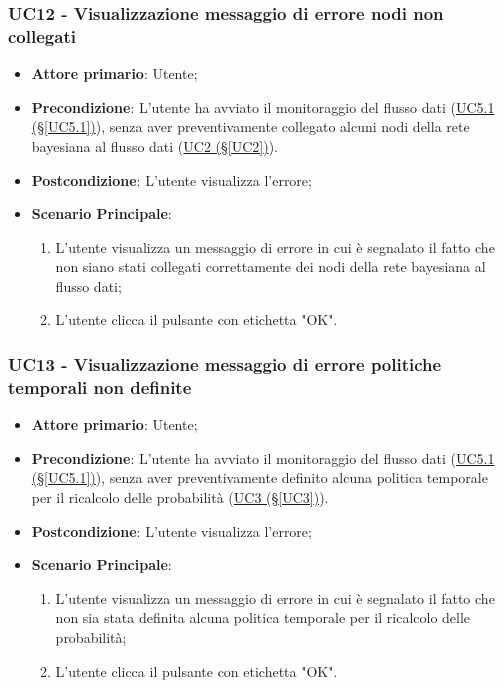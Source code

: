 \pagebreak

\subsubsection{UC12 - Visualizzazione messaggio di errore nodi non collegati}\label{UC12}
\begin{itemize}
\item \textbf{Attore primario}: Utente;
\item \textbf{Precondizione}: L'utente ha avviato il monitoraggio del flusso dati (\hyperref[UC5.1]{UC5.1 							(§\ref*{UC5.1})}), senza aver preventivamente collegato alcuni nodi della rete bayesiana al flusso dati 							(\hyperref[UC2]{UC2 (§\ref*{UC2})}).
\item \textbf{Postcondizione}: L'utente visualizza l'errore;
\item \textbf{Scenario Principale}: 
	\begin{enumerate}
	\item L'utente visualizza un messaggio di errore in cui è segnalato il fatto che non siano stati collegati 						correttamente dei nodi della rete bayesiana al flusso dati;
	\item L'utente clicca il pulsante con etichetta "OK".
	\end{enumerate}
\end{itemize}

\pagebreak

\subsubsection{UC13 - Visualizzazione messaggio di errore politiche temporali non definite}\label{UC13}
\begin{itemize}
\item \textbf{Attore primario}: Utente;
\item \textbf{Precondizione}: L'utente ha avviato il monitoraggio del flusso dati (\hyperref[UC5.1]{UC5.1 							(§\ref*{UC5.1})}), senza aver preventivamente definito alcuna politica temporale per il ricalcolo delle 							probabilità (\hyperref[UC3]{UC3 (§\ref*{UC3})}).
\item \textbf{Postcondizione}: L'utente visualizza l'errore;
\item \textbf{Scenario Principale}: 
	\begin{enumerate}
	\item L'utente visualizza un messaggio di errore in cui è segnalato il fatto che non sia stata definita alcuna 				politica temporale per il ricalcolo delle probabilità;
	\item L'utente clicca il pulsante con etichetta "OK".
	\end{enumerate}
\end{itemize}

